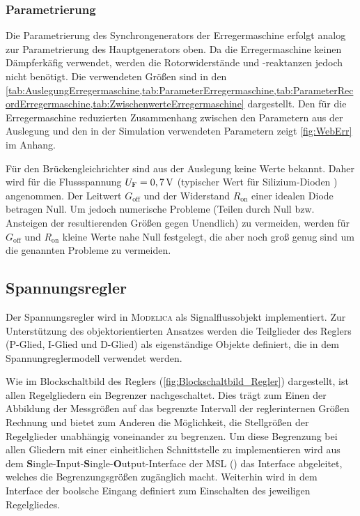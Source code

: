 
\hypertarget{parametrierung-2}{%
\subsubsection{Parametrierung}\label{parametrierung-2}}

Die Parametrierung des Synchrongenerators der Erregermaschine erfolgt analog zur Parametrierung des Hauptgenerators oben. Da die Erregermaschine keinen Dämpferkäfig verwendet, werden die Rotorwiderstände und -reaktanzen jedoch nicht benötigt. Die verwendeten Größen sind in den  \cref{tab:AuslegungErregermaschine,tab:ParameterErregermaschine,tab:ParameterRecordErregermaschine,tab:ZwischenwerteErregermaschine} dargestellt. Den für die Erregermaschine reduzierten Zusammenhang zwischen den Parametern aus der Auslegung und den in der Simulation verwendeten Parametern zeigt \cref{fig:WebErr} im Anhang.

Für den Brückengleichrichter sind aus der Auslegung keine Werte bekannt. Daher wird für die Flussspannung \(U_{\mathrm{F}}=\unit[0,7]{V}\) (typischer Wert für Silizium-Dioden \cite{??} ) angenommen. Der Leitwert \(G_{\mathrm{off}}\) und der Widerstand \(R_{\mathrm{on}}\) einer idealen Diode betragen Null. Um jedoch numerische Probleme (Teilen durch Null bzw. Ansteigen der resultierenden Größen gegen Unendlich) zu vermeiden, werden für \(G_{\mathrm{off}}\) und \(R_{\mathrm{on}}\) kleine Werte nahe Null festgelegt, die aber noch groß genug sind um die genannten Probleme zu vermeiden.
\subsection{Spannungsregler}\label{sec:Spannungsregler}
Der Spannungsregler wird in \textsc{Modelica} als Signalflussobjekt implementiert. Zur Unterstützung des objektorientierten Ansatzes werden die Teilglieder des Reglers (P-Glied, I-Glied und D-Glied) als eigenständige Objekte definiert, die in dem Spannungreglermodell verwendet werden.

Wie im Blockschaltbild des Reglers (\cref{fig:Blockschaltbild_Regler}) dargestellt, ist allen Regelgliedern ein Begrenzer nachgeschaltet. Dies trägt zum Einen der Abbildung der Messgrößen auf das begrenzte Intervall der reglerinternen Größen Rechnung und bietet zum Anderen die Möglichkeit, die Stellgrößen der Regelglieder unabhängig voneinander zu begrenzen. Um diese Begrenzung bei allen Gliedern mit einer einheitlichen Schnittstelle zu implementieren wird aus dem \textbf{S}ingle-\textbf{I}nput-\textbf{S}ingle-\textbf{O}utput-Interface der MSL () das Interface  abgeleitet, welches die Begrenzungsgrößen zugänglich macht. Weiterhin wird in dem Interface der boolsche Eingang  definiert zum Einschalten des jeweiligen Regelgliedes.­

